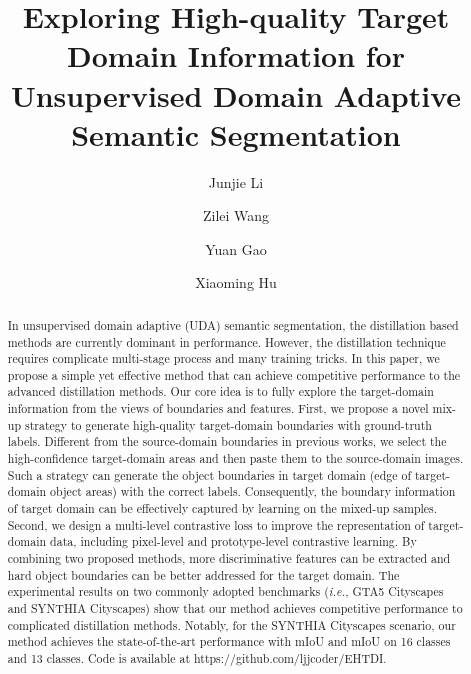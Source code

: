 \documentclass[sigconf]{acmart}
\begin{document}
\title{Exploring High-quality Target Domain Information for Unsupervised Domain Adaptive Semantic Segmentation}
	
\author{Junjie Li}
	
	\author{Zilei Wang}
	
	
	\author{Yuan Gao}
	
	\author{Xiaoming Hu}
	
	
	
	
	
\renewcommand{\shortauthors}{Junjie Li, Zilei Wang, Yuan Gao, \& Xiaoming Hu}	
\begin{abstract}
		In unsupervised domain adaptive (UDA) semantic segmentation, the distillation based methods are currently dominant in performance. However, the distillation technique requires complicate multi-stage process and many training tricks. 
		In this paper, we propose a simple yet effective method that can achieve competitive performance to the advanced distillation methods. Our core idea is to fully explore the target-domain information from the views of boundaries and features. 
		First, we propose a novel mix-up strategy to generate high-quality target-domain boundaries with ground-truth labels. Different from the source-domain boundaries in previous works, we select the high-confidence target-domain areas and then paste them to the source-domain images. Such a strategy can generate the object boundaries in target domain (edge of target-domain object areas) with the correct labels. Consequently, the boundary information of target domain can be effectively captured by learning on the mixed-up samples.
		Second, we design a multi-level contrastive loss to improve the representation of target-domain data, including pixel-level and prototype-level contrastive learning. 
		By combining two proposed methods, more discriminative features can be extracted and hard object boundaries can be better addressed for the target domain.
		The experimental results on two commonly adopted benchmarks (\textit{i.e.}, GTA5  Cityscapes and SYNTHIA  Cityscapes) show that our method achieves competitive performance to complicated distillation methods. Notably, for the SYNTHIA Cityscapes scenario, our method
		achieves the state-of-the-art performance with  mIoU and  mIoU on 16 classes and 13 classes. Code is available at https://github.com/ljjcoder/EHTDI.
	\end{abstract}
	
\end{document}

